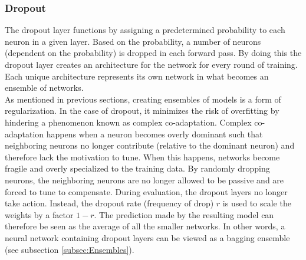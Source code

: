 \subsubsection*{Dropout}\label{subsubsec:Dropout}
The dropout layer functions by assigning a predetermined probability to each neuron in a given layer. Based on the 
probability, a number of neurons (dependent on the probability) is dropped in each forward pass. By doing this the 
dropout layer creates an architecture for the network for every round of training. Each unique architecture represents 
its own network in what becomes an ensemble of networks. 
\\
As mentioned in previous sections, creating ensembles of models is a form of regularization. In the case of 
dropout, it minimizes the risk of overfitting by hindering a phenomenon known as complex co-adaptation. Complex
co-adaptation happens when a neuron becomes overly dominant such that neighboring neurons no longer contribute (relative
to the dominant neuron) and therefore lack the motivation to tune. When this happens, networks become fragile and overly 
specialized to the training data. By randomly dropping neurons, the neighboring neurons are no longer allowed to be passive 
and are forced to tune to compensate. During evaluation, the dropout layers no longer take action. Instead, the dropout rate 
(frequency of drop) $r$ is used to scale the weights by a factor $1-r$. The prediction made by the resulting 
model can therefore be seen as the average of all the smaller networks. In other words, a neural network containing dropout layers 
can be viewed as a bagging ensemble (see subsection \ref{subsec:Ensembles}). 

